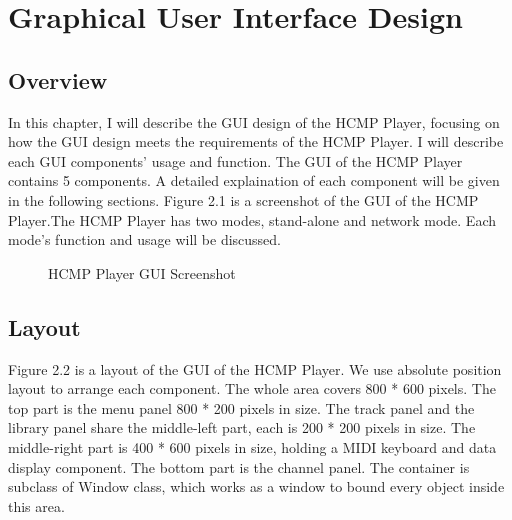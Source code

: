 
\chapter{Graphical User Interface Design} %

\section{Overview}
In this chapter, I will describe the GUI design of the HCMP Player, focusing 
on how the GUI design meets the requirements of the HCMP Player. I will describe
each GUI components' 
usage and function. The GUI of the HCMP Player contains 5 components.
A detailed explaination of each component will be given in the following sections. 
Figure 2.1 is a screenshot of the GUI of the HCMP Player.The HCMP Player has 
two modes, 
stand-alone and network mode. Each mode's function and usage will be discussed.

\begin{figure}[H]
\caption{HCMP Player GUI Screenshot}
\end{figure}

\section{Layout}
Figure 2.2 is a layout of the GUI of the HCMP Player. We use absolute position layout 
to arrange each component. The whole area 
covers 800 * 600 pixels. The top part is the menu panel 800 * 200 pixels 
in size. The track panel and 
the library panel share the middle-left part, each is 200 * 200 pixels in size. 
The middle-right part is 400 * 600 pixels in size, holding a MIDI keyboard and data 
display component. The bottom part is the channel panel. The container is subclass of
Window class, which works as a window to bound every object inside this area. 


